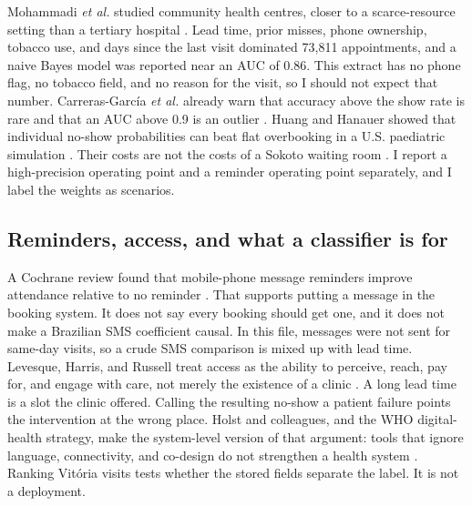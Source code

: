 \documentclass[journal]{IEEEtran}
\begin{document}
Mohammadi \emph{et al.} studied community health centres, closer to a scarce-resource setting than a tertiary hospital \cite{mohammadi2018}. Lead time, prior misses, phone ownership, tobacco use, and days since the last visit dominated 73{,}811 appointments, and a naive Bayes model was reported near an AUC of 0.86. This extract has no phone flag, no tobacco field, and no reason for the visit, so I should not expect that number. Carreras-Garc\'ia \emph{et al.} already warn that accuracy above the show rate is rare and that an AUC above 0.9 is an outlier \cite{carreras2020}. Huang and Hanauer showed that individual no-show probabilities can beat flat overbooking in a U.S. paediatric simulation \cite{huang2014}. Their costs are not the costs of a Sokoto waiting room \cite{oche2013}. I report a high-precision operating point and a reminder operating point separately, and I label the weights as scenarios.

\subsection{Reminders, access, and what a classifier is for}
A Cochrane review found that mobile-phone message reminders improve attendance relative to no reminder \cite{gurol2013}. That supports putting a message in the booking system. It does not say every booking should get one, and it does not make a Brazilian SMS coefficient causal. In this file, messages were not sent for same-day visits, so a crude SMS comparison is mixed up with lead time. Levesque, Harris, and Russell treat access as the ability to perceive, reach, pay for, and engage with care, not merely the existence of a clinic \cite{levesque2013}. A long lead time is a slot the clinic offered. Calling the resulting no-show a patient failure points the intervention at the wrong place. Holst and colleagues, and the WHO digital-health strategy, make the system-level version of that argument: tools that ignore language, connectivity, and co-design do not strengthen a health system \cite{holst2020,who2021}. Ranking Vit\'oria visits tests whether the stored fields separate the label. It is not a deployment.
\end{document}
